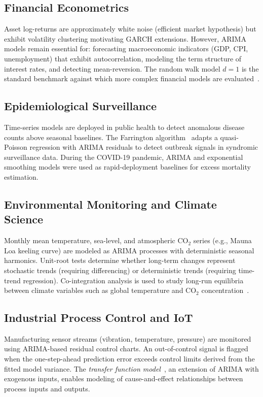 \documentclass[conference]{IEEEtran}
\theoremstyle{definition}
\begin{document}
\subsection{Financial Econometrics}

Asset log-returns are approximately white noise (efficient market hypothesis)
but exhibit volatility clustering motivating GARCH extensions. However,
ARIMA models remain essential for: forecasting macroeconomic indicators
(GDP, CPI, unemployment) that exhibit autocorrelation, modeling the term
structure of interest rates, and detecting mean-reversion. The random walk
model $d = 1$ is the standard benchmark against which more complex financial
models are evaluated~\cite{hamilton1994time}.

\subsection{Epidemiological Surveillance}

Time-series models are deployed in public health to detect anomalous
disease counts above seasonal baselines. The Farrington
algorithm~\cite{farrington1996statistical} adapts a quasi-Poisson regression
with ARIMA residuals to detect outbreak signals in syndromic surveillance
data. During the COVID-19 pandemic, ARIMA and exponential smoothing models
were used as rapid-deployment baselines for excess mortality estimation.

\subsection{Environmental Monitoring and Climate Science}

Monthly mean temperature, sea-level, and atmospheric CO$_2$ series
(e.g., Mauna Loa keeling curve) are modeled as ARIMA processes with
deterministic seasonal harmonics. Unit-root tests determine whether
long-term changes represent stochastic trends (requiring differencing) or
deterministic trends (requiring time-trend regression). Co-integration
analysis is used to study long-run equilibria between climate variables such
as global temperature and CO$_2$ concentration~\cite{engle1987co}.

\subsection{Industrial Process Control and IoT}

Manufacturing sensor streams (vibration, temperature, pressure) are
monitored using ARIMA-based residual control charts. An out-of-control
signal is flagged when the one-step-ahead prediction error exceeds control
limits derived from the fitted model variance. The \emph{transfer function
model}~\cite{box2015time}, an extension of ARIMA with exogenous inputs,
enables modeling of cause-and-effect relationships between process inputs
and outputs.
\end{document}
